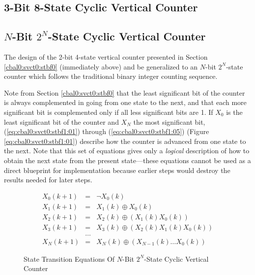 \subsection{3-Bit 8-State Cyclic Vertical Counter}
\label{cbal0:svct0:stbf4}


\subsection[$N$-Bit $2^N$-State Cyclic Vertical Counter]
           {\mbox{\boldmath $N$}-Bit \mbox{\boldmath $2^N$}-State Cyclic Vertical Counter}
\label{cbal0:svct0:stbf1}

The design of the 2-bit 4-state vertical counter presented in
Section \ref{cbal0:svct0:stbf0} (immediately above) and be
generalized to an $N$-bit $2^N$-state counter which follows
the traditional binary integer counting sequence.

Note from Section \ref{cbal0:svct0:stbf0} that the least
significant bit of the counter is always complemented
in going from one state to the next, and that each more
significant bit is complemented only if all less significant 
bits are 1.  If $X_0$ is the least significant bit of the 
counter and $X_N$ the most significant bit,
(\ref{eq:cbal0:svct0:stbf1:01}) through (\ref{eq:cbal0:svct0:stbf1:05})
(Figure \ref{eq:cbal0:svct0:stbf1:01})
describe how the counter is advanced from one state to the next.
Note that this set of equations gives only a \emph{logical} description
of how to obtain the next state from the present state---these
equations cannot be used as a direct blueprint for implementation because
earlier steps would destroy the results needed for later steps.

\begin{figure}
\begin{eqnarray}
\label{eq:cbal0:svct0:stbf1:01}
  X_0(k+1) & = & \neg X_0(k)                             \\
\label{eq:cbal0:svct0:stbf1:02}
  X_1(k+1) & = & X_1(k) \oplus X_0(k)                    \\ 
\label{eq:cbal0:svct0:stbf1:03}
  X_2(k+1) & = & X_2(k) \oplus (X_1(k) X_0(k))           \\
\label{eq:cbal0:svct0:stbf1:04}
  X_3(k+1) & = & X_3(k) \oplus (X_2(k) X_1(k) X_0(k))    \\
           & \ldots & \nonumber                          \\
\label{eq:cbal0:svct0:stbf1:05}
  X_N(k+1) & = & X_N(k) \oplus (X_{N-1}(k) \ldots X_0(k))
\end{eqnarray}
\caption{State Transition Equations Of $N$-Bit $2^N$-State Cyclic Vertical Counter}
\label{fig:cbal0:svct0:stbf1:01}
\end{figure}

